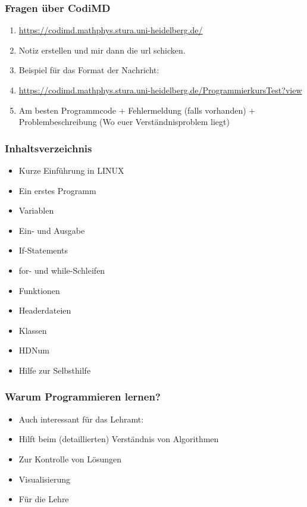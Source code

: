 \documentclass[ignorenonframetext,12pt]{beamer}
\theoremstyle{definition}
\theoremstyle{definition}
\begin{document}
\begin{frame}[fragile]
\frametitle{Fragen über CodiMD}
\begin{enumerate}
\small
\item \url{https://codimd.mathphys.stura.uni-heidelberg.de/}
\item Notiz erstellen und mir dann die url schicken.
\item Beispiel für das Format der Nachricht:
\item \url{https://codimd.mathphys.stura.uni-heidelberg.de/ProgrammierkursTest?view}
\item Am besten Programmcode + Fehlermeldung (falls vorhanden) + Problembeschreibung (Wo euer Verständnisproblem liegt)

\end{enumerate}
\end{frame}


\begin{frame}[fragile]
\frametitle{Inhaltsverzeichnis}
\begin{itemize}
\footnotesize
\item Kurze Einführung in LINUX
\item Ein erstes Programm
\item Variablen
\item Ein- und Ausgabe
\item If-Statements
\item for- und while-Schleifen
\item Funktionen
\item Headerdateien
\item Klassen
\item HDNum
\item Hilfe zur Selbsthilfe
\end{itemize}
\end{frame}


\begin{frame}[fragile]
\frametitle{Warum Programmieren lernen?}
\begin{itemize}
\item Auch interessant für das Lehramt:
\item Hilft beim (detaillierten) Verständnis von Algorithmen
\item Zur Kontrolle von Lösungen
\item Visualisierung
\item Für die Lehre
\end{itemize}
\end{frame}
\end{document}
